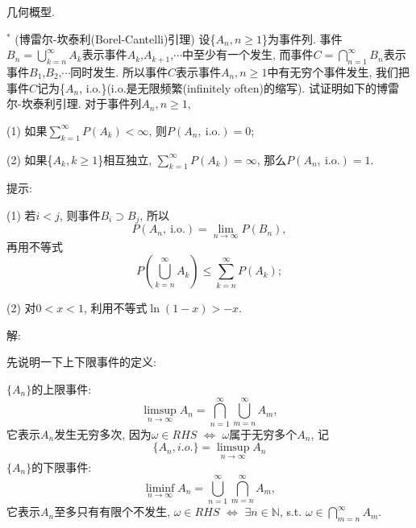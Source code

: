 \documentclass[standard]{ExBook}
\begin{document}
\begin{qitems}
\begin{bbox}
\textcolor{themeColor}{\selectfont {} 几何概型.}
    \end{bbox}

\vspace{-5em}

    \begin{bbox}
    \begin{shaded}
        \qitem$^*$
(博雷尔-坎泰利(Borel-Cantelli)引理) 设\{$A_n,n \geq 1$\}为事件列. 事件$B_{n}=\bigcup\limits_{k=n}^{\infty}A_{k}$表示事件$A_{k}$,$A_{k+1}$,$\cdots$中至少有一个发生, 而事件$C=\bigcap\limits_{n=1}^{\infty}B_{n}$表示事件$B_{1}$,$B_{2}$,$\cdots$同时发生. 所以事件$C$表示事件$A_{n},n \geq 1$中有无穷个事件发生, 我们把事件$C$记为\{$A_{n}$, i.o.\}(i.o.是无限频繁(infinitely often)的缩写). 试证明如下的博雷尔-坎泰利引理. 对于事件列$A_{n},n \geq 1$,

(1) 如果$\sum\limits_{k=1}^{\infty}P(A_{k})<\infty$, 则$P(A_{n},\ \text{i.o.})=0$;

(2) 如果\{$A_{k},k \geq 1$\}相互独立, $\sum\limits_{k=1}^{\infty}P(A_{k})=\infty$, 那么$P(A_{n},\ \text{i.o.})=1$.

提示:

(1) 若$i<j$, 则事件$B_{i}\supset B_{j}$, 所以
$$P(A_{n},\ \text{i.o.})=\lim\limits_{n \to \infty}P(B_{n}),$$
再用不等式
$$P(\bigcup\limits_{k=n}^{\infty}A_{k}) \leq \sum\limits_{k=n}^{\infty}P(A_{k});$$

(2) 对$0 < x < 1$, 利用不等式$\ln(1-x) > -x$.
    \end{shaded}
    \end{bbox}

\vspace{-5em}

    \begin{bbox}
解: 

先说明一下上下限事件的定义: 

$\{A_{n}\}$的上限事件: 
$$\limsup\limits_{n\to\infty}A_{n}=\bigcap\limits_{n=1}^{\infty}\bigcup\limits_{m=n}^{\infty}A_{m},$$
它表示$A_{n}$发生无穷多次, 因为$\omega\in RHS$ $\Longleftrightarrow$ $\omega$属于无穷多个$A_{n}$, 记
$$\{A_{n},i.o.\}=\limsup\limits_{n\to\infty}A_{n}$$
$\{A_{n}\}$的下限事件: 
$$\liminf\limits_{n\to\infty}A_{n}=\bigcup\limits_{n=1}^{\infty}\bigcap\limits_{m=n}^{\infty}A_{m},$$
它表示$A_{n}$至多只有有限个不发生, $\omega\in RHS$ $\Longleftrightarrow$ $\exists n\in \mathbb{N}$, s.t. $\omega\in\bigcap\limits_{m=n}^{\infty}A_{m}$.

    \end{bbox}

\vspace{-5em}


\end{qitems}
\end{document}

